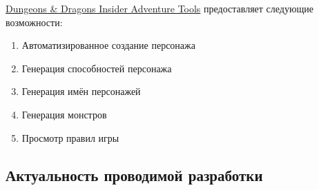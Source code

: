 \href{http://www.wizards.com/dnd/Tool.aspx?x=dnd/4new/tool/adventuretools}{Dungeons \& Dragons Insider Adventure Tools} предоставляет следующие возможности:
\begin{enumerate}
\item Автоматизированное создание персонажа
\item Генерация способностей персонажа
\item Генерация имён персонажей
\item Генерация монстров
\item Просмотр правил игры
\end{enumerate}


\subsection{Актуальность проводимой разработки}







